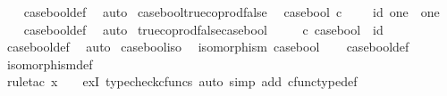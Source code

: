 \begin{isabellebody}
%
\isadelimproof
\ \ %
\endisadelimproof
%
\isatagproof
{}\isamarkupfalse%
\ case{\isacharunderscore}{\kern0pt}bool{\isacharunderscore}{\kern0pt}def{}\ \isamarkupfalse%
\ auto%
\endisatagproof
{\isafoldproof}%
%
\isadelimproof
\isanewline
%
\endisadelimproof
\isanewline
{}\isamarkupfalse%
\ case{\isacharunderscore}{\kern0pt}bool{\isacharunderscore}{\kern0pt}true{\isacharunderscore}{\kern0pt}coprod{\isacharunderscore}{\kern0pt}false{\isacharcolon}{\kern0pt}\isanewline
\ \ {\isachardoublequoteopen}case{\isacharunderscore}{\kern0pt}bool\ {\isasymcirc}\isactrlsub c\ {\isacharparenleft}{\kern0pt}{\isasymt}\ {\isasymamalg}\ {\isasymf}{\isacharparenright}{\kern0pt}\ {\isacharequal}{\kern0pt}\ id\ {\isacharparenleft}{\kern0pt}one\ {\isasymCoprod}\ one{\isacharparenright}{\kern0pt}{\isachardoublequoteclose}\isanewline
%
\isadelimproof
\ \ %
\endisadelimproof
%
\isatagproof
{}\isamarkupfalse%
\ case{\isacharunderscore}{\kern0pt}bool{\isacharunderscore}{\kern0pt}def{}\ \isamarkupfalse%
\ auto%
\endisatagproof
{\isafoldproof}%
%
\isadelimproof
\isanewline
%
\endisadelimproof
\isanewline
{}\isamarkupfalse%
\ true{\isacharunderscore}{\kern0pt}coprod{\isacharunderscore}{\kern0pt}false{\isacharunderscore}{\kern0pt}case{\isacharunderscore}{\kern0pt}bool{\isacharcolon}{\kern0pt}\isanewline
\ \ {\isachardoublequoteopen}{\isacharparenleft}{\kern0pt}{\isasymt}\ {\isasymamalg}\ {\isasymf}{\isacharparenright}{\kern0pt}\ {\isasymcirc}\isactrlsub c\ case{\isacharunderscore}{\kern0pt}bool\ {\isacharequal}{\kern0pt}\ id\ {\isasymOmega}{\isachardoublequoteclose}\isanewline
%
\isadelimproof
\ \ %
\endisadelimproof
%
\isatagproof
{}\isamarkupfalse%
\ case{\isacharunderscore}{\kern0pt}bool{\isacharunderscore}{\kern0pt}def{}\ \isamarkupfalse%
\ auto%
\endisatagproof
{\isafoldproof}%
%
\isadelimproof
\isanewline
%
\endisadelimproof
\isanewline
{}\isamarkupfalse%
\ case{\isacharunderscore}{\kern0pt}bool{\isacharunderscore}{\kern0pt}iso{\isacharcolon}{\kern0pt}\isanewline
\ \ {\isachardoublequoteopen}isomorphism\ case{\isacharunderscore}{\kern0pt}bool{\isachardoublequoteclose}\isanewline
%
\isadelimproof
\ \ %
\endisadelimproof
%
\isatagproof
{}\isamarkupfalse%
\ case{\isacharunderscore}{\kern0pt}bool{\isacharunderscore}{\kern0pt}def{}\ \isamarkupfalse%
\ isomorphism{\isacharunderscore}{\kern0pt}def\isanewline
\ \ \isamarkupfalse%
\ {\isacharparenleft}{\kern0pt}rule{\isacharunderscore}{\kern0pt}tac\ x{\isacharequal}{\kern0pt}{\isachardoublequoteopen}{\isasymt}\ {\isasymamalg}\ {\isasymf}{\isachardoublequoteclose}\ \ exI{\isacharcomma}{\kern0pt}\ typecheck{\isacharunderscore}{\kern0pt}cfuncs{\isacharcomma}{\kern0pt}\ auto\ simp\ add{\isacharcolon}{\kern0pt}\ cfunc{\isacharunderscore}{\kern0pt}type{\isacharunderscore}{\kern0pt}def{\isacharparenright}{\kern0pt}%

\end{isabellebody}
